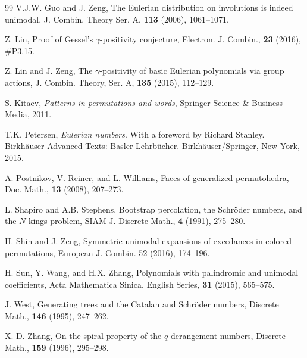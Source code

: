 \documentclass[12pt]{amsart}
\numberwithin{equation}{section}
\theoremstyle{plain}
\theoremstyle{definition}
\begin{document}
\begin{thebibliography}{99}
V.J.W. Guo and J. Zeng, The Eulerian distribution on involutions is indeed unimodal, J. Combin. Theory Ser. A, {\bf113} (2006), 1061--1071.

 Z. Lin, Proof of Gessel's $\gamma$-positivity conjecture,  Electron. J. Combin., {\bf23}     (2016), \#P3.15.

 Z. Lin and J. Zeng, 
The $\gamma$-positivity of basic Eulerian polynomials via group actions, 
J. Combin. Theory, Ser.  A, {\bf135} (2015), 112--129.

 S. Kitaev, {\em Patterns in permutations and words}, Springer Science \& Business Media, 2011.

T.K. Petersen,  {\em Eulerian numbers}. With a foreword by Richard Stanley. Birkh\"auser Advanced Texts: Basler Lehrb\"ucher. Birkh\"auser/Springer, New York, 2015.








A. Postnikov, V. Reiner, and L. Williams, Faces of generalized permutohedra,
Doc. Math., {\bf13} (2008), 207--273.

L. Shapiro and A.B. Stephens,
Bootstrap percolation, the Schr\"oder numbers, and the $N$-kings problem,
SIAM J. Discrete Math., {\bf4} (1991),  275--280. 

H. Shin and J. Zeng, Symmetric unimodal expansions of excedances in colored permutations, European
J. Combin. 52 (2016), 174--196.





  




 H. Sun, Y. Wang, and H.X. Zhang, Polynomials with palindromic and unimodal coefficients, Acta Mathematica Sinica, English Series, {\bf 31} (2015), 565--575.





 J. West, Generating trees and the Catalan and Schr\"oder numbers, Discrete Math.,  {\bf 146} (1995), 247--262. 
  


X.-D. Zhang, On the spiral property of the $q$-derangement numbers, Discrete Math., {\bf159} (1996),  $295$--$298$. 

\end{thebibliography}
\end{document}
